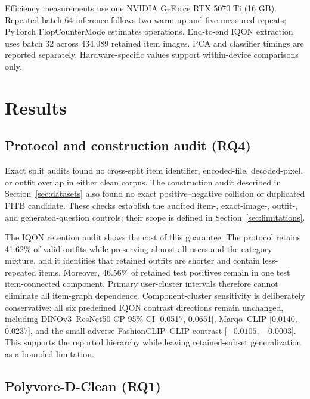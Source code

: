 \documentclass[pdflatex,sn-mathphys-num,iicol]{sn-jnl}
\begin{document}
Efficiency measurements use one NVIDIA GeForce RTX 5070 Ti (16 GB). Repeated batch-64 inference follows two warm-up and five measured repeats; PyTorch FlopCounterMode estimates operations. End-to-end IQON extraction uses batch 32 across 434,089 retained item images. PCA and classifier timings are reported separately. Hardware-specific values support within-device comparisons only.

\section{Results}\label{sec:results}

\subsection{Protocol and construction audit (RQ4)}\label{sec:protocolaudit}

Exact split audits found no cross-split item identifier, encoded-file, decoded-pixel, or outfit overlap in either clean corpus. The construction audit described in Section~\ref{sec:datasets} also found no exact positive--negative collision or duplicated FITB candidate. These checks establish the audited item-, exact-image-, outfit-, and generated-question controls; their scope is defined in Section~\ref{sec:limitations}.

The IQON retention audit shows the cost of this guarantee. The protocol retains 41.62\% of valid outfits while preserving almost all users and the category mixture, and it identifies that retained outfits are shorter and contain less-repeated items. Moreover, 46.56\% of retained test positives remain in one test item-connected component. Primary user-cluster intervals therefore cannot eliminate all item-graph dependence. Component-cluster sensitivity is deliberately conservative: all six predefined IQON contrast directions remain unchanged, including DINOv3--ResNet50 CP 95\% CI [0.0517, 0.0651], Marqo--CLIP [0.0140, 0.0237], and the small adverse FashionCLIP--CLIP contrast [$-0.0105$, $-0.0003$]. This supports the reported hierarchy while leaving retained-subset generalization as a bounded limitation.

\subsection{Polyvore-D-Clean (RQ1)}\label{sec:poly}
\end{document}

